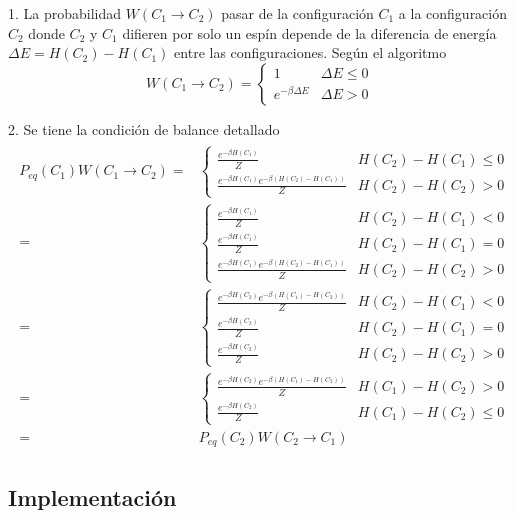 \documentclass{article}
\begin{document}
1. La probabilidad $W(C_1\rightarrow C_2)$ pasar de la configuración $C_1$ a la configuración $C_2$ donde $C_2$ y $C_1$ difieren por solo un espín depende de la diferencia de energía $\Delta E=H(C_2)-H(C_1)$ entre las configuraciones. Según el algoritmo
\begin{equation}
W(C_1\rightarrow C_2)=\begin{cases}
1 & \Delta E\leq 0 \\
e^{-\beta\Delta E} & \Delta E> 0
\end{cases}
\end{equation}

2. Se tiene la condición de balance detallado
\begin{align}\label{ec:condicion_de_balance_detallado}
\begin{split}
P_{eq}(C_1)W(C_1\rightarrow C_2)=&\begin{cases}
\frac{e^{-\beta H(C_1)}}{Z} & H(C_2)-H(C_1)\leq 0\\
\frac{e^{-\beta H(C_1)}e^{-\beta (H(C_2)-H(C_1))}}{Z} & H(C_2) - H(C_2) > 0
\end{cases}\\
=&\begin{cases}
\frac{e^{-\beta H(C_1)}}{Z} & H(C_2)-H(C_1)< 0\\
\frac{e^{-\beta H(C_1)}}{Z} & H(C_2)-H(C_1)= 0\\
\frac{e^{-\beta H(C_1)}e^{-\beta (H(C_2)-H(C_1))}}{Z} & H(C_2) - H(C_2) > 0
\end{cases}\\
=&\begin{cases}
\frac{e^{-\beta H(C_2)}e^{-\beta (H(C_1)-H(C_2))}}{Z} & H(C_2)-H(C_1)< 0\\
\frac{e^{-\beta H(C_2)}}{Z} & H(C_2)-H(C_1)= 0\\
\frac{e^{-\beta H(C_2)}}{Z} & H(C_2) - H(C_2) > 0
\end{cases}\\
=&\begin{cases}
\frac{e^{-\beta H(C_2)}e^{-\beta (H(C_1)-H(C_2))}}{Z} & H(C_1)-H(C_2)> 0\\
\frac{e^{-\beta H(C_2)}}{Z} & H(C_1) - H(C_2) \leq 0
\end{cases}\\
=&P_{eq}(C_2)W(C_2\rightarrow C_1)
\end{split}
\end{align}

\subsection{Implementación}
\end{document}

